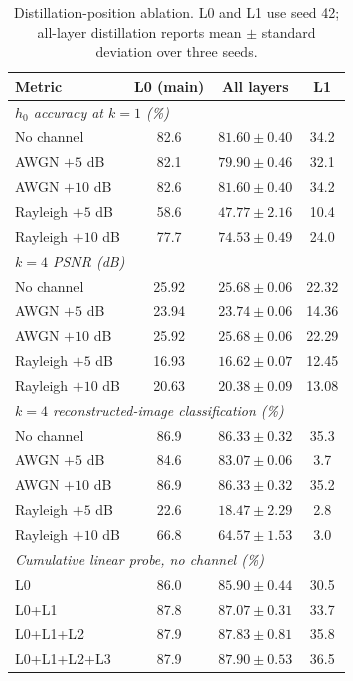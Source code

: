 \documentclass[letterpaper,journal]{IEEEtran}
\begin{document}
\begin{table}[!t]
\centering
\caption{Distillation-position ablation. L0 and L1 use seed 42; all-layer distillation reports mean $\pm$ standard deviation over three seeds.}
\label{tab:position}
\scriptsize
\setlength{\tabcolsep}{8pt}
\begin{tabular}{@{}lccc@{}}
\toprule
Metric & L0 (main) & All layers & L1 \\ \midrule
\multicolumn{4}{l}{\textit{$h_0$ accuracy at $k=1$ (\%)}} \\
No channel & 82.6 & $81.60\pm0.40$ & 34.2 \\
AWGN $+5$ dB & 82.1 & $79.90\pm0.46$ & 32.1 \\
AWGN $+10$ dB & 82.6 & $81.60\pm0.40$ & 34.2 \\
Rayleigh $+5$ dB & 58.6 & $47.77\pm2.16$ & 10.4 \\
Rayleigh $+10$ dB & 77.7 & $74.53\pm0.49$ & 24.0 \\ \midrule
\multicolumn{4}{l}{\textit{$k=4$ PSNR (dB)}} \\
No channel & 25.92 & $25.68\pm0.06$ & 22.32 \\
AWGN $+5$ dB & 23.94 & $23.74\pm0.06$ & 14.36 \\
AWGN $+10$ dB & 25.92 & $25.68\pm0.06$ & 22.29 \\
Rayleigh $+5$ dB & 16.93 & $16.62\pm0.07$ & 12.45 \\
Rayleigh $+10$ dB & 20.63 & $20.38\pm0.09$ & 13.08 \\ \midrule
\multicolumn{4}{l}{\textit{$k=4$ reconstructed-image classification (\%)}} \\
No channel & 86.9 & $86.33\pm0.32$ & 35.3 \\
AWGN $+5$ dB & 84.6 & $83.07\pm0.06$ & 3.7 \\
AWGN $+10$ dB & 86.9 & $86.33\pm0.32$ & 35.2 \\
Rayleigh $+5$ dB & 22.6 & $18.47\pm2.29$ & 2.8 \\
Rayleigh $+10$ dB & 66.8 & $64.57\pm1.53$ & 3.0 \\ \midrule
\multicolumn{4}{l}{\textit{Cumulative linear probe, no channel (\%)}} \\
L0 & 86.0 & $85.90\pm0.44$ & 30.5 \\
L0+L1 & 87.8 & $87.07\pm0.31$ & 33.7 \\
L0+L1+L2 & 87.9 & $87.83\pm0.81$ & 35.8 \\
L0+L1+L2+L3 & 87.9 & $87.90\pm0.53$ & 36.5 \\ \bottomrule
\end{tabular}
\end{table}
\end{document}
